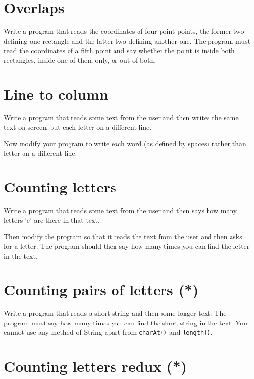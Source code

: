 \documentclass{article}
\begin{document}
\section{Overlaps}
\label{sec:insideinside}

Write a program that reads the coordinates of four point points, the
former two defining one rectangle and the latter two defining
another one. The program must read the coordinates of a fifth point and
say whether the point is inside both rectangles, inside one of them
only, or out of both. 


\section{Line to column}
\label{sec:line-column}

Write a program that reads some text from the user and then writes the
same text on screen, but each letter on a different line. 

Now modify your program to write each word (as defined by spaces)
rather than letter on a different line. 

\section{Counting letters}
\label{sec:counting-letters}

Write a program that reads some text from the user and then says how
many letters 'e' are there in that text. 

Then modify the program so that it reads the text from the user and
then asks for a letter. The program should then say how many times you
can find the letter in the text. 

\section{Counting pairs of letters (*)}
\label{sec:count-pairs-lett}

Write a program that reads a short string and then some longer
text. The program must say how many times you can find the short string in the
text. You cannot use any method of String apart from \verb+charAt()+
and \verb+length()+. 

\section{Counting letters redux (*)}
\label{sec:count-lett-redux}
\end{document}
